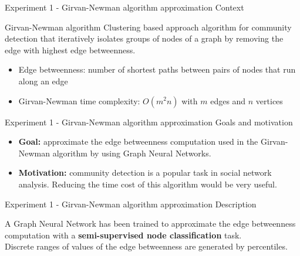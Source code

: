 \documentclass[xcolor=table]{beamer}
\begin{document}
\begin{frame}{Experiment 1 - Girvan-Newman algorithm approximation }{ Context}

\begin{block}{Girvan-Newman algorithm}{
        Clustering based approach algorithm for community detection that iteratively isolates groups of nodes of a graph by removing the edge with highest edge betweenness.
    }\end{block}


\begin{itemize}
    \item Edge betweenness: number of shortest paths between pairs of nodes that run along an edge
    \item Girvan-Newman time complexity: $O(m^{2}n)$ with $m$ edges and $n$ vertices
\end{itemize}


\end{frame}



\begin{frame}{Experiment 1 - Girvan-Newman algorithm approximation }{ Goals and motivation}

\begin{itemize}
    \item \textbf{Goal:} approximate the edge betweenness computation used in the Girvan-Newman algorithm by using Graph Neural Networks. 
    \item \textbf{Motivation:} community detection is a popular task in social network analysis. Reducing the time cost of this algorithm would be very useful.
\end{itemize}


\end{frame}


\begin{frame}{Experiment 1 - Girvan-Newman algorithm approximation }{ Description}


A Graph Neural Network has been trained to approximate the edge betweenness computation with a \textbf{semi-supervised node classification} task.\\

Discrete ranges of values of the edge betweenness are generated by percentiles.\\


\end{frame}
\end{document}
